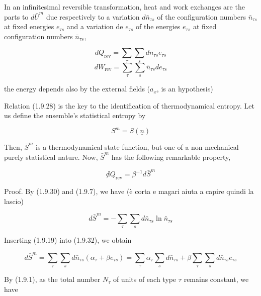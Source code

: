\documentclass{article}
\begin{document}
In an infinitesimal reversible transformation, heat and work exchanges are the parts to $d \bar{U}^{m}$ due respectively to a variation $d \bar{n}_{\tau s}$ of the configuration numbers $\bar{n}_{\tau s}$ at fixed energies $e_{\tau s}$ and a variation de $e_{\tau s}$ of the energies $e_{\tau s}$ at fixed configuration numbers $\bar{n}_{\tau s}$,

\begin{equation}
 d Q_{\mathrm{rev}}=\sum_{\tau} \sum_{s} d \bar{n}_{\tau s} e_{\tau s}  \tag{1.9.28} 
 \end{equation}
 \begin{equation}
 d W_{\mathrm{rev}}=\sum_{\tau} \sum_{s} \bar{n}_{\tau s} d e_{\tau s} \tag{1.9.29} 
\end{equation}

the energy depends also by the external fields ($a_x$, is an hypothesis)

Relation (1.9.28) is the key to the identification of thermodynamical entropy.
Let us define the ensemble's statistical entropy by
 
\begin{equation*}
S^{m}=S(\underline{n}) \tag{1.9.30}
\end{equation*}
 

Then, $\bar{S}^{m}$ is a thermodynamical state function, but one of a non mechanical purely statistical nature. Now, $\bar{S}^{m}$ has the following remarkable property,
 
\begin{equation*}
\not d Q_{\mathrm{rev}}=\beta^{-1} d \bar{S}^{m} \tag{1.9.31}
\end{equation*}
 

Proof. By (1.9.30) and (1.9.7), we have (è corta e magari aiuta a capire quindi la lascio)
 
\begin{equation*}
d \bar{S}^{m}=-\sum_{\tau} \sum_{s} d \bar{n}_{\tau s} \ln \bar{n}_{\tau s} \tag{1.9.32}
\end{equation*}
 

Inserting (1.9.19) into (1.9.32), we obtain
 
\begin{equation*}
d \bar{S}^{m}=\sum_{\tau} \sum_{s} d \bar{n}_{\tau s}\left(\alpha_{\tau}+\beta e_{\tau s}\right)=\sum_{\tau} \alpha_{\tau} \sum_{s} d \bar{n}_{\tau s}+\beta \sum_{\tau} \sum_{s} d \bar{n}_{\tau s} e_{\tau s} \tag{1.9.33}
\end{equation*}
 

By (1.9.1), as the total number $N_{\tau}$ of units of each type $\tau$ remains constant, we have
 
\end{document}
